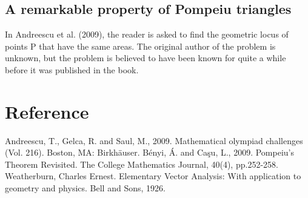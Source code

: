 \documentclass[12pt]{article}
\begin{document}
\subsection{A remarkable property of Pompeiu triangles}
In Andreescu et al. (2009), the reader is asked to find the geometric locus of points P that have the same areas. The original author of the problem is unknown, but the problem is believed to have been known for quite a while before it was published in the book. 

\section{Reference}
Andreescu, T., Gelca, R. and Saul, M., 2009. Mathematical olympiad challenges (Vol. 216). Boston, MA: Birkhäuser.
Bényi, Á. and Caşu, L., 2009. Pompeiu's Theorem Revisited. The College Mathematics Journal, 40(4), pp.252-258.
Weatherburn, Charles Ernest. Elementary Vector Analysis: With application to geometry and physics. Bell and Sons, 1926.
\end{document}
